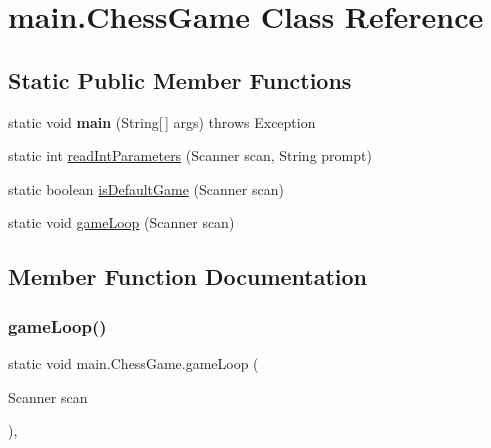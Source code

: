 \hypertarget{classmain_1_1_chess_game}{}\section{main.\+Chess\+Game Class Reference}
\label{classmain_1_1_chess_game}
\subsection*{Static Public Member Functions}
\begin{DoxyCompactItemize}
\item 
\mbox{\label{classmain_1_1_chess_game_a815db2aa8a3071549397df25c5c9b9f3}} 
static void {\bfseries main} (String\mbox{[}$\,$\mbox{]} args)  throws Exception 
\item 
static int \hyperlink{classmain_1_1_chess_game_a544d67af18a48fb13caf01ba9c5e2fda}{read\+Int\+Parameters} (Scanner scan, String prompt)
\item 
static boolean \hyperlink{classmain_1_1_chess_game_a522322a2f8481f1707e430f742cec611}{is\+Default\+Game} (Scanner scan)
\item 
static void \hyperlink{classmain_1_1_chess_game_a1e51ecdb31b1564e841a201a4e3076c2}{game\+Loop} (Scanner scan)
\end{DoxyCompactItemize}


\subsection{Member Function Documentation}
\mbox{\label{classmain_1_1_chess_game_a1e51ecdb31b1564e841a201a4e3076c2}} 
\subsubsection{\texorpdfstring{game\+Loop()}{gameLoop()}}
{\footnotesize\ttfamily static void main.\+Chess\+Game.\+game\+Loop (\begin{DoxyParamCaption}\item[{Scanner}]{scan }\end{DoxyParamCaption})\hspace{0.3cm}{\ttfamily [inline]}, {\ttfamily [static]}}

